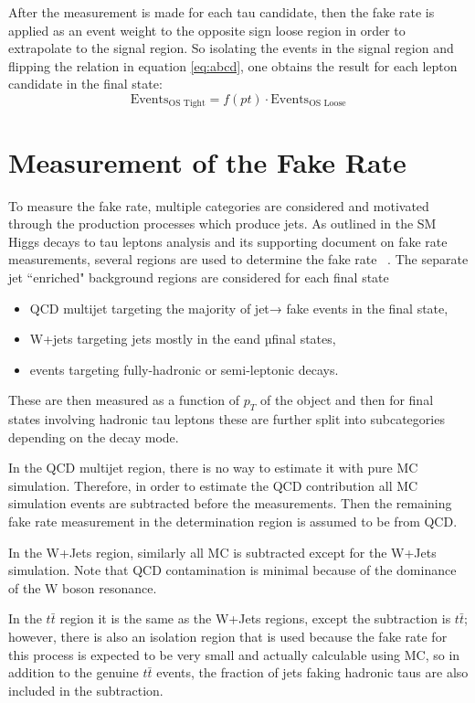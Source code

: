 After the measurement is made for each tau candidate, then the fake rate is applied as an event weight to the opposite sign loose region in order to extrapolate to the signal region. So isolating the events in the signal region and flipping the relation in equation \ref{eq:abcd}, one obtains the result for each lepton candidate in the final state: 
\begin{equation}
\text{Events}_\text{OS Tight} = f(pt)\cdot \text{Events}_\text{OS Loose}  
\end{equation}

\section{Measurement of the Fake Rate}
To measure the fake rate, multiple categories are considered and motivated through the production processes which produce jets. As outlined in the SM Higgs decays to tau leptons analysis and its supporting document on fake rate measurements, several regions are used to determine the fake rate ~\cite{AN16355}. The separate jet ``enriched" background regions are considered for each final state
\begin{itemize}
	\item QCD multijet targeting the majority of jet→ \tauh fake events in the \tauh \tauh final state,
	\item W+jets targeting jets mostly in the e\tauh and µ\tauh final states,
	\item \ttbar events targeting fully-hadronic or semi-leptonic decays.
\end{itemize} 



These are then measured as a function of $p_T$ of the object and then for final states involving hadronic tau leptons these are further split into subcategories depending on the decay mode.  

In the QCD multijet region, there is no way to estimate it with pure MC simulation. Therefore, in order to estimate the QCD contribution all MC simulation events are subtracted before the measurements. Then the remaining fake rate measurement in the determination region is assumed to be from QCD.

In the W+Jets region, similarly all MC is subtracted except for the W+Jets simulation. Note that QCD contamination is minimal because of the dominance of the W boson resonance. 

In the $t\bar{t}$ region it is the same as the W+Jets regions, except the subtraction is $t\bar{t}$; however, there is also an isolation region that is used because the fake rate for this process is expected to be very small and actually calculable using MC, so in addition to the genuine $t\bar{t}$ events, the fraction of jets faking hadronic taus are also included in the subtraction. 



